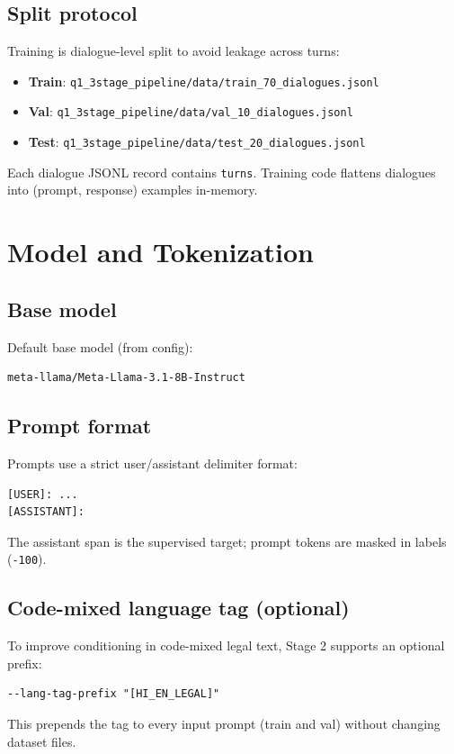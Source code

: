 \documentclass[11pt]{article}
\begin{document}
\subsection{Split protocol}
Training is dialogue-level split to avoid leakage across turns:
\begin{itemize}
  \item \textbf{Train}: \texttt{q1\_3stage\_pipeline/data/train\_70\_dialogues.jsonl}
  \item \textbf{Val}: \texttt{q1\_3stage\_pipeline/data/val\_10\_dialogues.jsonl}
  \item \textbf{Test}: \texttt{q1\_3stage\_pipeline/data/test\_20\_dialogues.jsonl}
\end{itemize}
Each dialogue JSONL record contains \texttt{turns}. Training code flattens dialogues into (prompt, response) examples in-memory.

\section{Model and Tokenization}
\subsection{Base model}
Default base model (from config):
\begin{lstlisting}
meta-llama/Meta-Llama-3.1-8B-Instruct
\end{lstlisting}

\subsection{Prompt format}
Prompts use a strict user/assistant delimiter format:
\begin{lstlisting}
[USER]: ...
[ASSISTANT]:
\end{lstlisting}
The assistant span is the supervised target; prompt tokens are masked in labels (\texttt{-100}).

\subsection{Code-mixed language tag (optional)}
To improve conditioning in code-mixed legal text, Stage 2 supports an optional prefix:
\begin{lstlisting}
--lang-tag-prefix "[HI_EN_LEGAL]"
\end{lstlisting}
This prepends the tag to every input prompt (train and val) without changing dataset files.
\end{document}
